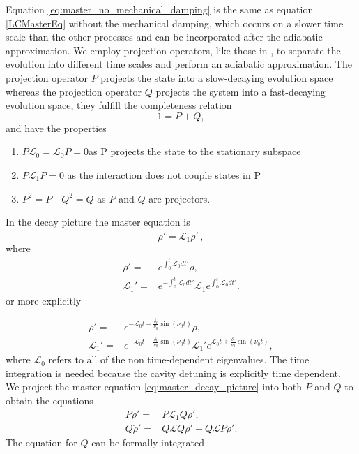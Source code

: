 \documentclass[reprint, amsmath,amssymb, aps,pra]{revtex4-1}
\begin{document}
Equation \eqref{eq:master_no_mechanical_damping} is the same as
equation \eqref{LCMasterEq} without the mechanical damping, which
occurs on a slower time scale than the other processes and can be
incorporated after the adiabatic approximation. We employ projection
operators, like those in \cite{CarmichaelQO}, to separate the
evolution into different time scales and perform an adiabatic
approximation. The projection operator $P$ projects the state into a
slow-decaying evolution space whereas the projection operator $Q$
projects the system into a fast-decaying evolution space, they fulfill
the completeness relation
\begin{equation}
1 = P + Q,
\end{equation}
and have the properties
\begin{enumerate}

\item $ P\mathcal{L}_{0} = \mathcal{L}_{0}P = 0 $\qquad as P projects the state to the stationary subspace
\item $P\mathcal{L}_{1}P=0$ \qquad as the interaction does not couple states in P

\item $P^2 = P \quad Q^2 = Q$ \qquad as $P$ and $Q$ are projectors.
\end{enumerate}
In the decay picture the master equation is 
\begin{equation}
  \label{eq:master_decay_picture}
    \dot{\rho'} = \mathcal{L}_1\rho'\, ,
\end{equation}
where
\begin{align*}
 \rho' =& e^{\int_0^t \mathcal{L}_0 dt'}\rho,\\
  \mathcal{L}_1' =& e^{-\int_0^t \mathcal{L}_0 dt'}\mathcal{L}_1e^{\int_0^t \mathcal{L}_0 dt'}.
\end{align*} or more explicitly

\begin{align}
\rho' =& e^{-\mathcal{L}_0t - \frac{\delta_t}{\nu_0} \sin(\nu_0t)}\rho,\\
\mathcal{L}_1' =&e^{-\mathcal{L}_0t - \frac{\delta_t}{\nu_0} \sin(\nu_0t)}\mathcal{L}_1' e^{\mathcal{L}_0t +\frac{\delta_t}{\nu_0} \sin(\nu_0t)},
\end{align} where $\mathcal{L}_0$ refers to all of the non time-dependent eigenvalues.  The time integration is needed because the cavity detuning is explicitly time dependent. We project the master equation \eqref{eq:master_decay_picture} into
both $P$ and $Q$ to obtain the equations 
\begin{align*}
P\dot{\rho}' =& P\mathcal{L}_1Q\rho', \\
Q\dot{\rho}' =& Q\mathcal{L}Q\rho' + Q\mathcal{L}P\rho'.
\end{align*} The equation for $Q$ can be formally integrated
\end{document}
